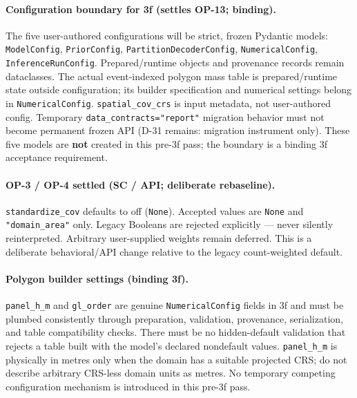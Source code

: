 \documentclass[
  10pt,
]{article}
\begin{document}
\paragraph{Configuration boundary for 3f (settles OP-13; binding).}
The five user-authored configurations will be strict, frozen Pydantic models:
\texttt{ModelConfig}, \texttt{PriorConfig}, \texttt{PartitionDecoderConfig}, \texttt{NumericalConfig}, \texttt{InferenceRunConfig}.
Prepared/runtime objects and provenance records remain dataclasses.
The actual event-indexed polygon mass table is prepared/runtime state outside configuration; its builder specification and numerical settings belong in \texttt{NumericalConfig}.
\texttt{spatial\_cov\_crs} is input metadata, not user-authored config.
Temporary \texttt{data\_contracts="report"} migration behavior must not become permanent frozen API (D-31 remains: migration instrument only).
These five models are \textbf{not} created in this pre-3f pass; the boundary is a binding 3f acceptance requirement.

\paragraph{OP-3 / OP-4 settled (SC / API; deliberate rebaseline).}
\texttt{standardize\_cov} defaults to off (\texttt{None}).
Accepted values are \texttt{None} and \texttt{"domain\_area"} only.
Legacy Booleans are rejected explicitly --- never silently reinterpreted.
Arbitrary user-supplied weights remain deferred.
This is a deliberate behavioral/API change relative to the legacy count-weighted default.

\paragraph{Polygon builder settings (binding 3f).}
\texttt{panel\_h\_m} and \texttt{gl\_order} are genuine \texttt{NumericalConfig} fields in 3f and must be plumbed consistently through preparation, validation, provenance, serialization, and table compatibility checks.
There must be no hidden-default validation that rejects a table built with the model's declared nondefault values.
\texttt{panel\_h\_m} is physically in metres only when the domain has a suitable projected CRS; do not describe arbitrary CRS-less domain units as metres.
No temporary competing configuration mechanism is introduced in this pre-3f pass.
\end{document}
